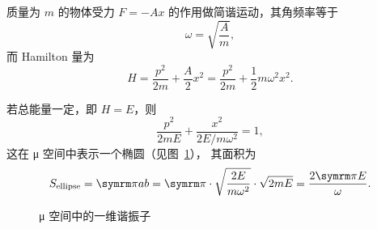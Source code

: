 \begin{example}[一维谐振子]
  质量为 $m$ 的物体受力 $F=-Ax$ 的作用做简谐运动，其角频率等于
  \begin{equation}
    \omega = \sqrt{\frac{A}{m}},
  \end{equation}
  而 Hamilton 量为
  \begin{equation}
    H = \frac{p^2}{2m} + \frac{A}{2} x^2
      = \frac{p^2}{2m} + \frac{1}{2} m \omega^2 x^2.
  \end{equation}

  若总能量一定，即 $H=E$，则
  \begin{equation}
    \frac{p^2}{2mE} + \frac{x^2}{2E / m \omega^2} = 1,
  \end{equation}
  这在 μ 空间中表示一个椭圆（见图~\ref{fig:harmonic-oscillator-mu-space}），
  其面积为
  \begin{equation} \label{eq:ellipse-of-harmonic-oscillator-mu-space}
    S_\text{ellipse} = \pp ab
      = \pp \cdot \sqrt{\frac{2E}{m \omega^2}} \cdot \sqrt{2mE}
      = \frac{2 \pp E}{\omega}.
  \end{equation}
\end{example}

\begin{figure}[ht]
  \centering
  \FIGPLACEHOLDER
  \caption{μ 空间中的一维谐振子}
  \label{fig:harmonic-oscillator-mu-space}
\end{figure}

